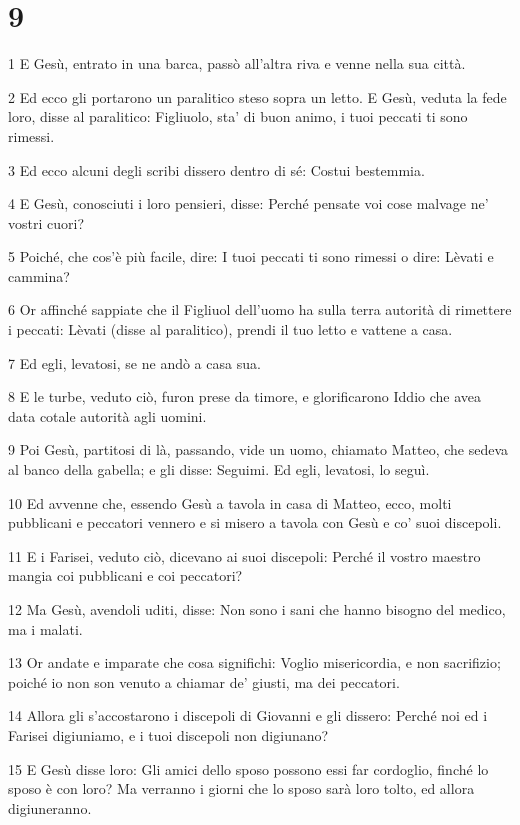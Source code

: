 \chapter{9}

\par 1 E Gesù, entrato in una barca, passò all'altra riva e venne nella sua città.
\par 2 Ed ecco gli portarono un paralitico steso sopra un letto. E Gesù, veduta la fede loro, disse al paralitico: Figliuolo, sta' di buon animo, i tuoi peccati ti sono rimessi.
\par 3 Ed ecco alcuni degli scribi dissero dentro di sé: Costui bestemmia.
\par 4 E Gesù, conosciuti i loro pensieri, disse: Perché pensate voi cose malvage ne' vostri cuori?
\par 5 Poiché, che cos'è più facile, dire: I tuoi peccati ti sono rimessi o dire: Lèvati e cammina?
\par 6 Or affinché sappiate che il Figliuol dell'uomo ha sulla terra autorità di rimettere i peccati: Lèvati (disse al paralitico), prendi il tuo letto e vattene a casa.
\par 7 Ed egli, levatosi, se ne andò a casa sua.
\par 8 E le turbe, veduto ciò, furon prese da timore, e glorificarono Iddio che avea data cotale autorità agli uomini.
\par 9 Poi Gesù, partitosi di là, passando, vide un uomo, chiamato Matteo, che sedeva al banco della gabella; e gli disse: Seguimi. Ed egli, levatosi, lo seguì.
\par 10 Ed avvenne che, essendo Gesù a tavola in casa di Matteo, ecco, molti pubblicani e peccatori vennero e si misero a tavola con Gesù e co' suoi discepoli.
\par 11 E i Farisei, veduto ciò, dicevano ai suoi discepoli: Perché il vostro maestro mangia coi pubblicani e coi peccatori?
\par 12 Ma Gesù, avendoli uditi, disse: Non sono i sani che hanno bisogno del medico, ma i malati.
\par 13 Or andate e imparate che cosa significhi: Voglio misericordia, e non sacrifizio; poiché io non son venuto a chiamar de' giusti, ma dei peccatori.
\par 14 Allora gli s'accostarono i discepoli di Giovanni e gli dissero: Perché noi ed i Farisei digiuniamo, e i tuoi discepoli non digiunano?
\par 15 E Gesù disse loro: Gli amici dello sposo possono essi far cordoglio, finché lo sposo è con loro? Ma verranno i giorni che lo sposo sarà loro tolto, ed allora digiuneranno.
